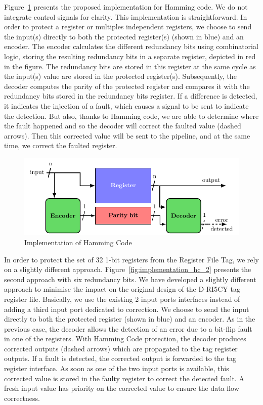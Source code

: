 Figure~\ref{fig:implementation_hc_1} presents the proposed implementation for Hamming code. We do not integrate control signals for clarity. This implementation is straightforward. In order to protect a register or multiples independent registers, we choose to send the input(s) directly to both the protected register(s) (shown in blue) and an encoder. The encoder calculates the different redundancy bits using combinatorial logic, storing the resulting redundancy bits in a separate register, depicted in red in the figure. The redundancy bits are stored in this register at the same cycle as the input(s) value are stored in the protected register(s). Subsequently, the decoder computes the parity of the protected register and compares it with the redundancy bits stored in the redundancy bits register. If a difference is detected, it indicates the injection of a fault, which causes a signal to be sent to indicate the detection. But also, thanks to Hamming code, we are able to determine where the fault happened and so the decoder will correct the faulted value (dashed arrows). Then this corrected value will be sent to the pipeline, and at the same time, we correct the faulted register.

\begin{figure}[ht]
    \centering
    \includegraphics[page=2, width=\textwidth]{c5_countermeasures_dift/img/archi_contremesures.pdf}
    \caption{Implementation of Hamming Code}
    \label{fig:implementation_hc_1}
\end{figure}

In order to protect the set of 32 1-bit registers from the Register File Tag, we rely on a slightly different approach. Figure~\ref{fig:implementation_hc_2} presents the second approach with six redundancy bits.
We have developed a slightly different approach to minimise the impact on the original design of the D-RI5CY tag register file. Basically, we use the existing 2 input ports interfaces instead of adding a third input port dedicated to correction. We choose to send the input directly to both the protected register (shown in blue) and an encoder. 
As in the previous case, the decoder allows the detection of an error due to a bit-flip fault in one of the registers. With Hamming Code protection, the decoder produces corrected outputs (dashed arrows) which are propagated to the tag register outputs. If a fault is detected, the corrected output is forwarded to the tag register interface. As soon as one of the two input ports is available, this corrected value is stored in the faulty register to correct the detected fault. A fresh input value has priority on the corrected value to ensure the data flow correctness. 

